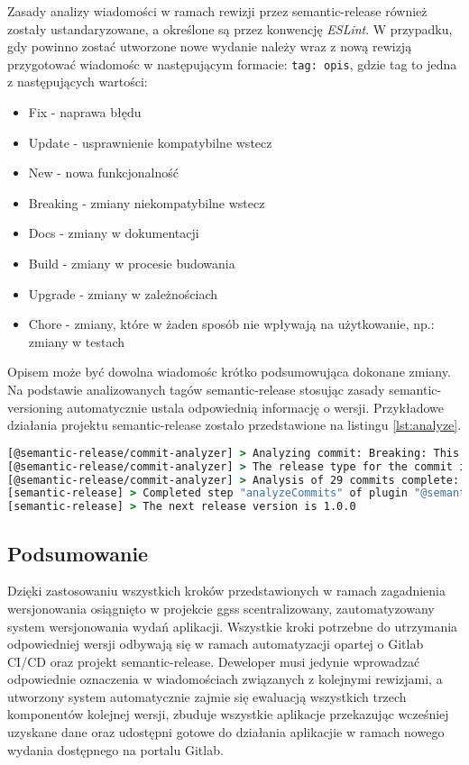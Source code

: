Zasady analizy wiadomości w ramach rewizji przez semantic-release również zostały ustandaryzowane, a określone są przez konwencję \emph{ESLint}. W przypadku, gdy powinno zostać utworzone nowe wydanie należy wraz z nową rewizją przygotować wiadomośc w następującym formacie: \lstinline{tag: opis}, gdzie tag to jedna z następujących wartości:
\begin{itemize}
    \item Fix - naprawa błędu
    \item Update - usprawnienie kompatybilne wstecz
    \item New - nowa funkcjonalność
    \item Breaking - zmiany niekompatybilne wstecz
    \item Docs - zmiany w dokumentacji
    \item Build - zmiany w procesie budowania
    \item Upgrade - zmiany w zależnościach
    \item Chore - zmiany, które w żaden sposób nie wpływają na użytkowanie, np.: zmiany w testach
\end{itemize}
Opisem może być dowolna wiadomośc krótko podsumowująca dokonane zmiany. Na podstawie analizowanych tagów semantic-release stosując zasady semantic-versioning automatycznie ustala odpowiednią informację o wersji. Przykładowe działania projektu semantic-release zostało przedstawione na listingu \ref{lst:analyze}.


\begin{lstlisting}[language=cmd, caption={Analiza wiadomości zawartych w rewizjach z wykorzystaniem semantic-release.}, label={lst:analyze}]
[@semantic-release/commit-analyzer] > Analyzing commit: Breaking: This is for presentation reasons
[@semantic-release/commit-analyzer] > The release type for the commit is major
[@semantic-release/commit-analyzer] > Analysis of 29 commits complete: major release
[semantic-release] > Completed step "analyzeCommits" of plugin "@semantic-release/commit-analyzer"
[semantic-release] > The next release version is 1.0.0
\end{lstlisting}

\subsection{Podsumowanie}

Dzięki zastosowaniu wszystkich kroków przedstawionych w ramach zagadnienia wersjonowania osiągnięto w projekcie ggss scentralizowany, zautomatyzowany system wersjonowania wydań aplikacji. Wszystkie kroki potrzebne do utrzymania odpowiedniej wersji odbywają się w ramach automatyzacji opartej o Gitlab CI/CD oraz projekt semantic-release. Deweloper musi jedynie wprowadzać odpowiednie oznaczenia w wiadomościach związanych z kolejnymi rewizjami, a utworzony system automatycznie zajmie się ewaluacją wszystkich trzech komponentów kolejnej wersji, zbuduje wszystkie aplikacje przekazując wcześniej uzyskane dane oraz udostępni gotowe do działania aplikacjie w ramach nowego wydania dostępnego na portalu Gitlab.


